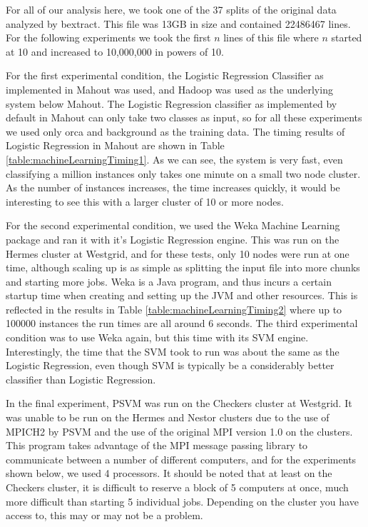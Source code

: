 For all of our analysis here, we took one of the 37 splits of the
original data analyzed by bextract.  This file was 13GB in size and
contained 22486467 lines.  For the following experiments we took the
first $n$ lines of this file where $n$ started at 10 and increased to
10,000,000 in powers of 10.

For the first experimental condition, the Logistic Regression
Classifier as implemented in Mahout was used, and Hadoop was used as
the underlying system below Mahout.  The Logistic Regression
classifier as implemented by default in Mahout can only take two
classes as input, so for all these experiments we used only orca and
background as the training data.  The timing results of Logistic
Regression in Mahout are shown in Table
\ref{table:machineLearningTiming1}.  As we can see, the system is very
fast, even classifying a million instances only takes one minute on a
small two node cluster.  As the number of instances increases, the
time increases quickly, it would be interesting to see this with a
larger cluster of 10 or more nodes.

For the second experimental condition, we used the Weka Machine
Learning package and ran it with it's Logistic Regression engine.
This was run on the Hermes cluster at Westgrid, and for these tests,
only 10 nodes were run at one time, although scaling up is as simple
as splitting the input file into more chunks and starting more jobs.
Weka is a Java program, and thus incurs a certain startup time when
creating and setting up the JVM and other resources.  This is
reflected in the results in Table \ref{table:machineLearningTiming2}
where up to 100000 instances the run times are all around 6 seconds.
The third experimental condition was to use Weka again, but this time
with its SVM engine.  Interestingly, the time that the SVM took to run
was about the same as the Logistic Regression, even though SVM is
typically be a considerably better classifier than Logistic
Regression.

In the final experiment, PSVM was run on the Checkers cluster at
Westgrid.  It was unable to be run on the Hermes and Nestor clusters
due to the use of MPICH2 by PSVM and the use of the original MPI
version 1.0 on the clusters.  This program takes advantage of the MPI
message passing library to communicate between a number of different
computers, and for the experiments shown below, we used 4 processors.
It should be noted that at least on the Checkers cluster, it is
difficult to reserve a block of 5 computers at once, much more
difficult than starting 5 individual jobs.  Depending on the cluster
you have access to, this may or may not be a problem.


